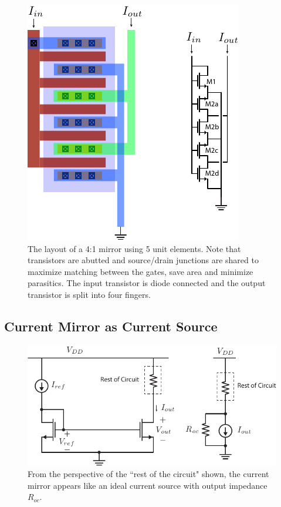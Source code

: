 \begin{figure}[tb]
\begin{center}
\includegraphics[width=.55\columnwidth]{mirror_layout.pdf} 
\end{center}
\caption{The layout of a 4:1 mirror using 5 unit elements. Note that transistors are abutted and source/drain junctions are shared to maximize matching between the gates, save area and minimize parasitics.  The input transistor is diode connected and the output transistor is split into four fingers.   } \label{fig:mirror_layout}
\end{figure}




\subsection{Current Mirror as Current Source}

\begin{figure}[tb]
\begin{center}
\includegraphics[scale=1]{7mirror_current_source.pdf}
\end{center}
\caption{From the perspective of the ``rest of the circuit" shown, the current mirror appears like an ideal current source with output impedance $R_{oc}$.} \label{fig:7mirror_current_source.pdf}
\end{figure}

